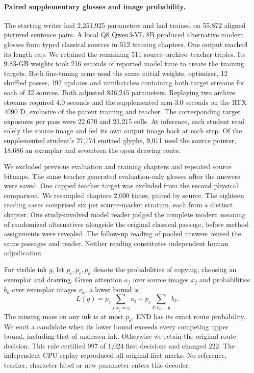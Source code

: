 \paragraph{Paired supplementary glosses and image probability.}
The starting writer had 2,251,925 parameters and had trained on 55,872 aligned pictured sentence pairs. A local Q8 Qwen3-VL 8B produced alternative modern glosses from typed classical sources in 512 training chapters. One output reached its length cap. We retained the remaining 511 source--archive--teacher triples. Its 9.83-GB weights took 216 seconds of reported model time to create the training targets. Both fine-tuning arms used the same initial weights, optimizer, 12 shuffled passes, 192 updates and minibatches containing both target streams for each of 32 sources. Both adjusted 836,245 parameters. Replaying two archive streams required 4.0 seconds and the supplemented arm 3.0 seconds on the RTX 4090 D, exclusive of the parent training and teacher. The corresponding target exposures per pass were 22,670 and 23,215 cells. At inference, each student read solely the source image and fed its own output image back at each step. Of the supplemented student's 27,774 emitted glyphs, 9,071 used the source pointer, 18,686 an exemplar and seventeen the open drawing route.

We excluded previous evaluation and training chapters and repeated source bitmaps. The same teacher generated evaluation-only glosses after the answers were saved. One capped teacher target was excluded from the second physical comparison. We resampled chapters 2,000 times, paired by source. The eighteen reading cases comprised six per source-marker stratum, each from a distinct chapter. One study-involved model reader judged the complete modern meaning of randomized alternatives alongside the original classical passage, before method assignments were revealed. The follow-up reading of pooled answers reused the same passages and reader. Neither reading constitutes independent human adjudication.

For visible ink $g$, let $p_c,p_e,p_d$ denote the probabilities of copying, choosing an exemplar and drawing. Given attention $a_j$ over source images $x_j$ and probabilities $b_k$ over exemplar images $v_k$, a lower bound is
\[
 L(g)=p_c\sum_{j:x_j=g}a_j+p_e\sum_{k:v_k=g}b_k .
\]
The missing mass on any ink is at most $p_d$. END has its exact route probability. We emit a candidate when its lower bound exceeds every competing upper bound, including that of undrawn ink. Otherwise we retain the original route decision. This rule certified 997 of 1,024 first decisions and changed 222. The independent CPU replay reproduced all original first marks. No reference, teacher, character label or new parameter enters this decoder.
